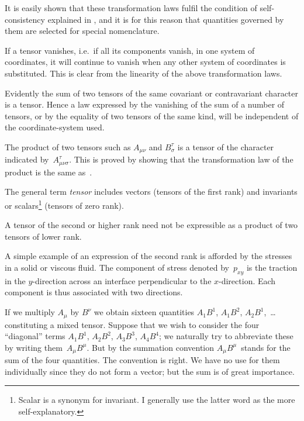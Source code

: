 \documentclass[12pt]{book}
\begin{document}
It is easily shown that these transformation laws fulfil the condition of
self\hyp{}consistency explained in , and it is for this reason that quantities
governed by them are selected for special nomenclature.

If a tensor vanishes, i.e.\ if all its components vanish, in one system of
coordinates, it will continue to vanish when any other system of coordinates
is substituted. This is clear from the linearity of the above transformation
laws.

Evidently the sum of two tensors of the same covariant or contravariant
character is a tensor. Hence a law expressed by the vanishing of the sum of
a number of tensors, or by the equality of two tensors of the same kind, will
be independent of the coordinate\hyp{}system used.

The product of two tensors such as $A_{\mu\nu}$ and $B_{\sigma}^{\tau}$ is a tensor of the character
indicated by~$A_{\mu\nu\sigma}^{\tau}$. This is proved by showing that the transformation law of
the product is the same as~.

The general term \emph{tensor} includes vectors (tensors of the first rank) and
invariants or scalars\footnote
  {Scalar is a synonym for invariant. I generally use the latter word as the more self\hyp{}explanatory.}
%
(tensors of zero rank).

A tensor of the second or higher rank need not be expressible as a product
of two tensors of lower rank.

A simple example of an expression of the second rank is afforded by the
stresses in a solid or viscous fluid. The component of stress denoted by~$p_{xy}$
is the traction in the $y$-direction across an interface perpendicular to the
$x$-direction. Each component is thus associated with two directions.


If we multiply $A_{\mu}$ by $B^{\nu}$ we obtain sixteen quantities $A_{1}B^{1}$, $A_{1}B^{2}$, $A_{2}B^{1}$,~\dots
constituting a mixed tensor. Suppose that we wish to consider the four
``diagonal'' terms $A_{1}B^{1}$, $A_{2}B^{2}$, $A_{3}B^{3}$, $A_{4}B^{4}$; we naturally try to abbreviate
these by writing them~$A_{\mu}B^{\mu}$. But by the summation convention $A_{\mu}B^{\mu}$~stands
for the sum of the four quantities. The convention is right. We have no use
for them individually since they do not form a vector; but the sum is of great
importance.
\end{document}
